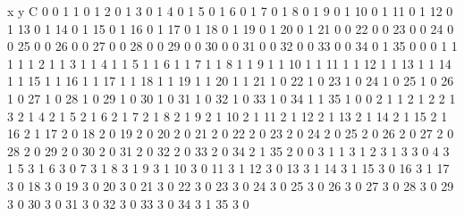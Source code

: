 x y C
0 0 1
1 0 1
2 0 1
3 0 1
4 0 1
5 0 1
6 0 1
7 0 1
8 0 1
9 0 1
10 0 1
11 0 1
12 0 1
13 0 1
14 0 1
15 0 1
16 0 1
17 0 1
18 0 1
19 0 1
20 0 1
21 0 0
22 0 0
23 0 0
24 0 0
25 0 0
26 0 0
27 0 0
28 0 0
29 0 0
30 0 0
31 0 0
32 0 0
33 0 0
34 0 1
35 0 0
0 1 1
1 1 1
2 1 1
3 1 1
4 1 1
5 1 1
6 1 1
7 1 1
8 1 1
9 1 1
10 1 1
11 1 1
12 1 1
13 1 1
14 1 1
15 1 1
16 1 1
17 1 1
18 1 1
19 1 1
20 1 1
21 1 0
22 1 0
23 1 0
24 1 0
25 1 0
26 1 0
27 1 0
28 1 0
29 1 0
30 1 0
31 1 0
32 1 0
33 1 0
34 1 1
35 1 0
0 2 1
1 2 1
2 2 1
3 2 1
4 2 1
5 2 1
6 2 1
7 2 1
8 2 1
9 2 1
10 2 1
11 2 1
12 2 1
13 2 1
14 2 1
15 2 1
16 2 1
17 2 0
18 2 0
19 2 0
20 2 0
21 2 0
22 2 0
23 2 0
24 2 0
25 2 0
26 2 0
27 2 0
28 2 0
29 2 0
30 2 0
31 2 0
32 2 0
33 2 0
34 2 1
35 2 0
0 3 1
1 3 1
2 3 1
3 3 0
4 3 1
5 3 1
6 3 0
7 3 1
8 3 1
9 3 1
10 3 0
11 3 1
12 3 0
13 3 1
14 3 1
15 3 0
16 3 1
17 3 0
18 3 0
19 3 0
20 3 0
21 3 0
22 3 0
23 3 0
24 3 0
25 3 0
26 3 0
27 3 0
28 3 0
29 3 0
30 3 0
31 3 0
32 3 0
33 3 0
34 3 1
35 3 0
